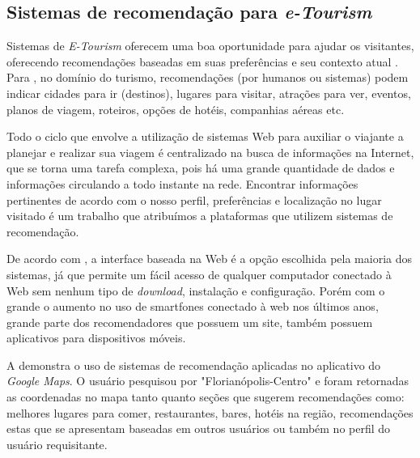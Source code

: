 \documentclass[portuguese]{textolivre}
\begin{document}
\subsection{Sistemas de recomendação para \textit{e-Tourism}}
Sistemas de \textit{E-Tourism} oferecem uma boa oportunidade para ajudar os visitantes, oferecendo recomendações baseadas em suas preferências e seu contexto atual \cite{BORRAS2014}. Para \textcite{loh2003tourism}, no domínio do turismo, recomendações (por humanos ou sistemas) podem indicar cidades para ir (destinos), lugares para visitar, atrações para ver, eventos, planos de viagem, roteiros, opções de hotéis, companhias aéreas etc.

Todo o ciclo que envolve a utilização de sistemas Web para auxiliar o viajante a planejar e realizar sua viagem é centralizado na busca de informações na Internet, que se torna uma tarefa complexa, pois há uma grande quantidade de dados e informações circulando a todo instante na rede. Encontrar informações pertinentes de acordo com o nosso perfil, preferências e localização no lugar visitado é um trabalho que atribuímos a plataformas que utilizem sistemas de recomendação.  

De acordo com \textcite{BORRAS2014}, a interface baseada na Web é a opção escolhida pela maioria dos sistemas, já que permite um fácil acesso de qualquer computador conectado à Web sem nenhum tipo de \textit{download}, instalação e configuração. Porém com o grande o aumento no uso de smartfones conectado à web nos últimos anos, grande parte dos recomendadores que possuem um site, também possuem aplicativos para dispositivos móveis.

A  demonstra o uso de sistemas de recomendação aplicadas no aplicativo do \textit{Google Maps}. O usuário pesquisou por "Florianópolis-Centro" e foram retornadas as coordenadas no mapa tanto quanto seções que sugerem recomendações como: melhores lugares para comer, restaurantes, bares, hotéis na região, recomendações estas que se apresentam baseadas em outros usuários ou também no perfil do usuário requisitante.  
\end{document}
